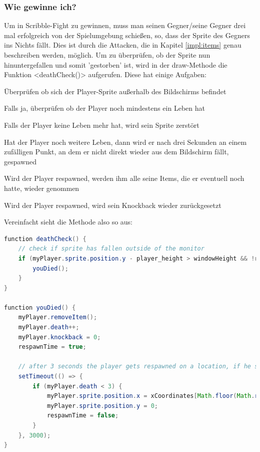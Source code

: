 \subsubsection{Wie gewinne ich?}
Um in Scribble-Fight zu gewinnen, muss man seinen Gegner/seine Gegner drei mal erfolgreich von der Spielumgebung schießen, so, dass der Sprite des Gegners ins Nichts fällt.
Dies ist durch die Attacken, die in Kapitel \ref{impl:items} genau beschreiben werden, möglich. 
Um zu überprüfen, ob der Sprite nun hinuntergefallen und somit 'gestorben' ist, wird in der draw-Methode die Funktion <deathCheck()> aufgerufen.
Diese hat einige Aufgaben:
\begin{compactitem}
    \item Überprüfen ob sich der Player-Sprite außerhalb des Bildschirms befindet
    \item Falls ja, überprüfen ob der Player noch mindestens ein Leben hat
    \item Falls der Player keine Leben mehr hat, wird sein Sprite zerstört
    \item Hat der Player noch weitere Leben, dann wird er nach drei Sekunden an einem zufälligen Punkt, an dem er nicht direkt wieder aus dem Bildschirm fällt, gespawned
    \item Wird der Player respawned, werden ihm alle seine Items, die er eventuell noch hatte, wieder genommen
    \item Wird der Player respawned, wird sein Knockback wieder zurückgesetzt
\end{compactitem}

Vereinfacht sieht die Methode also so aus:

\begin{lstlisting}[caption=Überprüfung nach Toden,language=Java,label=lst:impl:deathCheck]
function deathCheck() {
    // check if sprite has fallen outside of the monitor
    if (myPlayer.sprite.position.y - player_height > windowHeight && !respawnTime) {
        youDied();
    }
}

function youDied() {
    myPlayer.removeItem();
    myPlayer.death++;
    myPlayer.knockback = 0;
    respawnTime = true;

    // after 3 seconds the player gets respawned on a location, if he still has at least one live left
    setTimeout(() => {
        if (myPlayer.death < 3) {
            myPlayer.sprite.position.x = xCoordinates[Math.floor(Math.random() * xCoordinates.length)];
            myPlayer.sprite.position.y = 0;
            respawnTime = false;
        }
    }, 3000);
}
\end{lstlisting}

